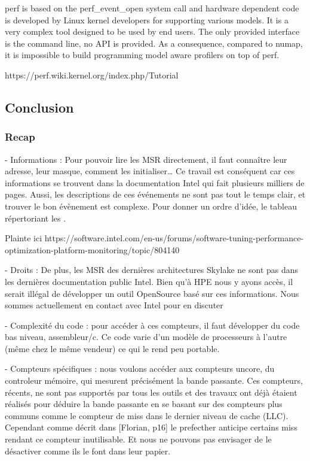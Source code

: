         perf is based on the perf_event_open system call and hardware dependent code is developed by Linux kernel developers for supporting various models. It is a very complex tool designed to be used by end users. The only provided interface is the command line, no API is provided. As a consequence, compared to numap, it is impossible to build programming model aware profilers on top of perf.
      
      https://perf.wiki.kernel.org/index.php/Tutorial

        
        
        
    
     

\subsection{Conclusion}   
    
    \subsubsection{Recap}
    -	Informations : Pour pouvoir lire les MSR directement, il faut connaître leur adresse, leur masque, comment les initialiser… Ce travail est conséquent car ces informations se trouvent dans la documentation Intel qui fait plusieurs milliers de pages. Aussi, les descriptions de ces événements ne sont pas tout le temps clair, et trouver le bon évènement est complexe. Pour donner un ordre d’idée, le tableau répertoriant les .
    
    Plainte ici 
    https://software.intel.com/en-us/forums/software-tuning-performance-optimization-platform-monitoring/topic/804140
    
    
    -	Droits : De plus, les MSR des dernières architectures Skylake ne sont pas dans les dernières documentation public Intel. Bien qu’à HPE nous y ayons accès, il serait illégal de développer un outil OpenSource basé sur ces informations. Nous sommes actuellement en contact avec Intel pour en discuter
    
    -	Complexité du code : pour accéder à ces compteurs, il faut développer du code bas niveau, assembleur/c. Ce code varie d’un modèle de processeurs à l’autre (même chez le même vendeur) ce qui le rend peu portable. 
    
    -	Compteurs spécifiques : nous voulons accéder aux compteurs uncore, du controleur mémoire, qui mesurent précisément la bande passante. Ces compteurs, récents, ne sont pas supportés par tous les outils et des travaux ont déjà étaient réalisés pour déduire la bande passante en se basant sur des compteurs plus communs comme le compteur de miss dans le dernier niveau de cache (LLC). Cependant comme décrit dans [Florian, p16] le prefecther anticipe certains miss rendant ce compteur inutilisable. Et nous ne pouvons pas envisager de le désactiver comme ils le font dans leur papier.
    

